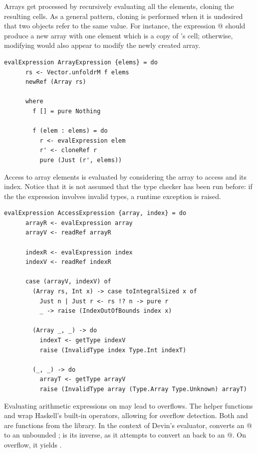 \documentclass[UdineBachThesis,american,11pt]{PhdThesis}
\begin{document}
  Arrays get processed by recursively evaluating all the elements, cloning the
  resulting cells. As a general pattern, cloning is performed when it is
  undesired that two objects refer to the same value. For instance, the
  expression \lstinline@[x]@ should produce a new array with one element which
  is a copy of \lstinline@x@'s cell; otherwise, modifying \lstinline@x@ would
  also appear to modify the newly created array.

  \begin{lstlisting}[gobble=4,basicstyle=\ttfamily\small]
    evalExpression ArrayExpression {elems} = do
      rs <- Vector.unfoldrM f elems
      newRef (Array rs)

      where
        f [] = pure Nothing

        f (elem : elems) = do
          r <- evalExpression elem
          r' <- cloneRef r
          pure (Just (r', elems))
  \end{lstlisting}

  Access to array elements is evaluated by considering the array to access and
  its index. Notice that it is not assumed that the type checker has been run
  before: if the the expression involves invalid types, a runtime exception is
  raised.

  \begin{lstlisting}[gobble=4,basicstyle=\ttfamily\small]
    evalExpression AccessExpression {array, index} = do
      arrayR <- evalExpression array
      arrayV <- readRef arrayR

      indexR <- evalExpression index
      indexV <- readRef indexR

      case (arrayV, indexV) of
        (Array rs, Int x) -> case toIntegralSized x of
          Just n | Just r <- rs !? n -> pure r
          _ -> raise (IndexOutOfBounds index x)

        (Array _, _) -> do
          indexT <- getType indexV
          raise (InvalidType index Type.Int indexT)

        (_, _) -> do
          arrayT <- getType arrayV
          raise (InvalidType array (Type.Array Type.Unknown) arrayT)
  \end{lstlisting}

  Evaluating arithmetic expressions on \lstinline@Int@s may lead to overflows.
  The helper functions \lstinline@safeUnary@ and \lstinline@safeBinary@ wrap
  Haskell's built-in operators, allowing for overflow detection. Both
  \lstinline@toInteger@ and \lstinline@toIntegralSized@ are functions from the
  \lstinline@base@ library. In the context of Devin's evaluator,
  \lstinline@toInteger@ converts an @ to an unbounded
  \lstinline@Integer@; \lstinline@toIntegralSized@ is its inverse, as it
  attempts to convert an \lstinline@Integer@ back to an @. On
  overflow, it yields \lstinline@Nothing@.
\end{document}
